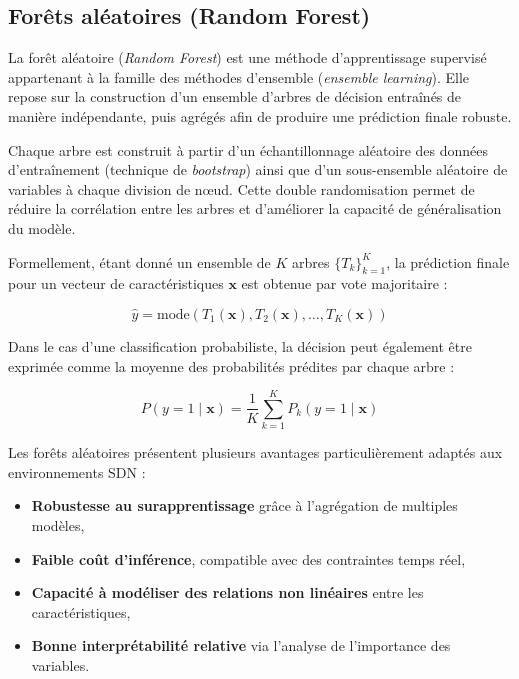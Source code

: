 \documentclass[11pt]{article}
\begin{document}
\subsection{Forêts aléatoires (Random Forest)}

La forêt aléatoire (\textit{Random Forest}) est une méthode d’apprentissage supervisé appartenant à la famille des méthodes d’ensemble (\textit{ensemble learning}). Elle repose sur la construction d’un ensemble d’arbres de décision entraînés de manière indépendante, puis agrégés afin de produire une prédiction finale robuste.

Chaque arbre est construit à partir d’un échantillonnage aléatoire des données d’entraînement (technique de \textit{bootstrap}) ainsi que d’un sous-ensemble aléatoire de variables à chaque division de nœud. Cette double randomisation permet de réduire la corrélation entre les arbres et d’améliorer la capacité de généralisation du modèle.

Formellement, étant donné un ensemble de $K$ arbres $\{T_k\}_{k=1}^{K}$, la prédiction finale pour un vecteur de caractéristiques $\mathbf{x}$ est obtenue par vote majoritaire :

\begin{equation}
\hat{y} = \mathrm{mode} \left( T_1(\mathbf{x}), T_2(\mathbf{x}), \dots, T_K(\mathbf{x}) \right)
\end{equation}

Dans le cas d’une classification probabiliste, la décision peut également être exprimée comme la moyenne des probabilités prédites par chaque arbre :

\begin{equation}
P(y=1 \mid \mathbf{x}) = \frac{1}{K} \sum_{k=1}^{K} P_k(y=1 \mid \mathbf{x})
\end{equation}

Les forêts aléatoires présentent plusieurs avantages particulièrement adaptés aux environnements SDN :

\begin{itemize}
    \item \textbf{Robustesse au surapprentissage} grâce à l’agrégation de multiples modèles,
    \item \textbf{Faible coût d’inférence}, compatible avec des contraintes temps réel,
    \item \textbf{Capacité à modéliser des relations non linéaires} entre les caractéristiques,
    \item \textbf{Bonne interprétabilité relative} via l’analyse de l’importance des variables.
\end{itemize}
\end{document}
